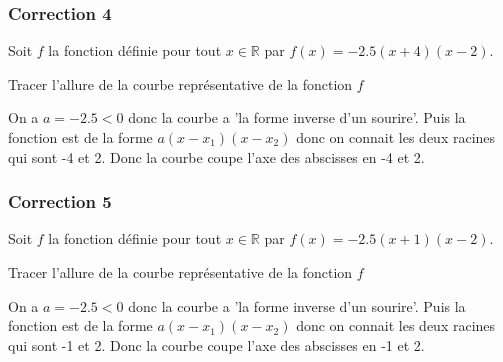 \documentclass[15pt, mathserif]{beamer}
\newcommand{\R}{\mathbb{R}}			%
\begin{document}
\begin{frame}
\vspace{-10mm}
	\frametitle{Correction 4}
 \vspace*{1cm} Soit $f$ la fonction définie pour tout $x \in \R$ par $f(x)=-2.5(x+4)(x-2)$. 
 
  Tracer l'allure de la courbe représentative de la fonction $f$ 
 
 \begin{multicols}{2} 
 On a $a=-2.5<0$ donc la courbe a 'la forme inverse d'un sourire'. Puis la fonction est de la forme $a(x-x_1)(x-x_2)$ donc on connait les deux racines qui sont -4 et 2. Donc la courbe coupe l'axe des abscisses en -4 et 2. 
 
  \columnbreak  
 
 \end{multicols} 
 \end{frame}


\begin{frame}
\vspace{-10mm}
	\frametitle{Correction 5}
 \vspace*{1cm} Soit $f$ la fonction définie pour tout $x \in \R$ par $f(x)=-2.5(x+1)(x-2)$. 
 
  Tracer l'allure de la courbe représentative de la fonction $f$ 
 
 \begin{multicols}{2} 
 On a $a=-2.5<0$ donc la courbe a 'la forme inverse d'un sourire'. Puis la fonction est de la forme $a(x-x_1)(x-x_2)$ donc on connait les deux racines qui sont -1 et 2. Donc la courbe coupe l'axe des abscisses en -1 et 2. 
 
  \columnbreak  
 
 \end{multicols} 
 \end{frame}
\end{document}
